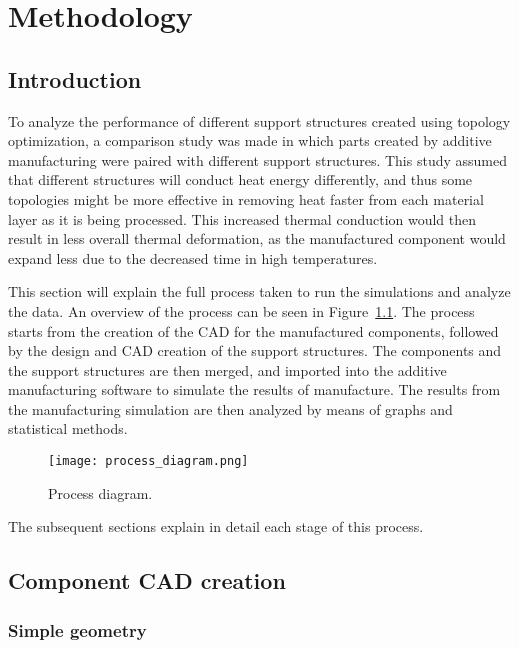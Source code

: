 \documentclass[../main.tex]{subfiles}
\begin{document}
	
\chapter{Methodology}
\section{Introduction}



To analyze the performance of different support structures created using topology optimization, a comparison study was made in which parts created by additive manufacturing were paired with different support structures. This study assumed that different structures will conduct heat energy differently, and thus some topologies might be more effective in removing heat faster from each material layer as it is being processed. This increased thermal conduction would then result in less overall thermal deformation, as the manufactured component would expand less due to the decreased time in high temperatures. 

This section will explain the full process taken to run the simulations and analyze the data. An overview of the process can be seen in Figure~\ref{fig:process_diagram}. The process starts from the creation of the CAD for the manufactured components, followed by the design and CAD creation of the support structures. The components and the support structures are then merged, and imported into the additive manufacturing software to simulate the results of manufacture. The results from the manufacturing simulation are then analyzed by means of graphs and statistical methods. 

\begin{figure}
  \begin{center}
    \texttt{[image: process\_diagram.png]}
  \end{center}
  \caption{Process diagram.}\label{fig:process_diagram}
\end{figure}

The subsequent sections explain in detail each stage of this process.

\section{Component CAD creation}

\subsection{Simple geometry}
\end{document}
